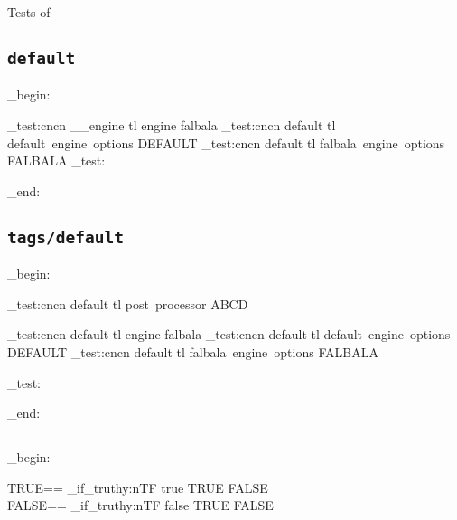 Tests of 
\noindent

\newcommand\meta[1]{{$\langle$}{\itshape #1}{$\rangle$}}

\subsection{\texttt{default}}
\ExplSyntaxOn
\group_begin:
\ExplSyntaxOff


\ExplSyntaxOn

\CDR_test:cncn { __engine } { tl } { engine } { falbala }
\CDR_test:cncn { default } { tl } { default~engine~options } { DEFAULT }
\CDR_test:cncn { default } { tl } { falbala~engine~options } { FALBALA }
\CDR_test:

\group_end:

\ExplSyntaxOff


\ExplSyntaxOn

\makeatletter
\def\CDR@Debug{\typeout}
\makeatother

\ExplSyntaxOff

\subsection{\texttt{tags/default}}
\ExplSyntaxOn
\group_begin:
\ExplSyntaxOff


\ExplSyntaxOn
\CDR_test:cncn { default } { tl } { post~processor } { ABCD }

\CDR_test:cncn { default } { tl } { engine } { falbala }
\CDR_test:cncn { default } { tl } { default~engine~options } { DEFAULT }
\CDR_test:cncn { default } { tl } { falbala~engine~options } { FALBALA }

\CDR_test:

\group_end:
\ExplSyntaxOff

\subsection{}
\ExplSyntaxOn
\group_begin:

TRUE==
\CDR_if_truthy:nTF { true } {
  TRUE
} {
  FALSE
}\\
FALSE==
\CDR_if_truthy:nTF { false } {
  TRUE
} {
  FALSE
}\\

